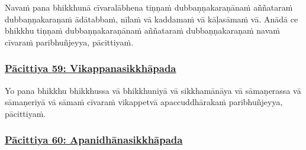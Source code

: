 Navaṁ pana\makeatletter\hyperlink{endnote339-appendix}\makeatother{} bhikkhunā cīvaralābhena tiṇṇaṁ dubbaṇṇakaraṇānaṁ aññataraṁ dubbaṇṇakaraṇaṁ ādātabbaṁ, nīlaṁ vā kaddamaṁ\makeatletter\hyperlink{endnote339-appendix}\makeatother{} vā kāḷasāmaṁ vā. Anādā ce bhikkhu tiṇṇaṁ dubbaṇṇakaraṇānaṁ aññataraṁ dubbaṇṇakaraṇaṁ navaṁ cīvaraṁ paribhuñjeyya, pācittiyaṁ.



\subsubsection*{\hyperref[exp59]{Pācittiya 59: Vikappanasikkhāpada}}
\label{pac59}
Yo pana bhikkhu bhikkhussa vā bhikkhuniyā\makeatletter\hyperlink{endnote340-appendix}\makeatother{} vā sikkhamānāya vā sāmaṇerassa vā sāmaṇeriyā\makeatletter\hyperlink{endnote341-appendix}\makeatother{} vā sāmaṁ cīvaraṁ vikappetvā apaccuddhārakaṁ\makeatletter\hyperlink{endnote342-appendix}\makeatother{} paribhuñjeyya, pācittiyaṁ.



\subsubsection*{\hyperref[exp60]{Pācittiya 60: Apanidhānasikkhāpada}}
\label{pac60}


